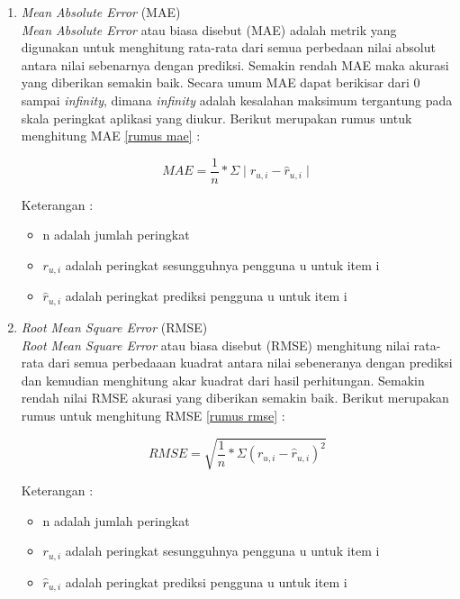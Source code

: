 \begin{enumerate}
    \item \textit{Mean Absolute Error} (MAE) \\
        \textit{Mean Absolute Error} atau biasa disebut (MAE) adalah metrik yang digunakan untuk menghitung rata-rata dari semua perbedaan nilai absolut antara nilai sebenarnya dengan prediksi. Semakin rendah MAE maka akurasi yang diberikan semakin baik. Secara umum MAE dapat berikisar dari 0 sampai \textit{infinity}, dimana \textit{infinity} adalah kesalahan maksimum tergantung pada skala peringkat aplikasi yang diukur. Berikut merupakan rumus untuk menghitung MAE \ref{rumus mae} : 
        
        \begin{equation}
            MAE = \frac{1}{n} * \Sigma \mid r_{u,i}-\hat{r}_{u,i} \mid
            \label{rumus mae}
        \end{equation}
        
        Keterangan : 
        
        \begin{itemize}
            \item n adalah jumlah peringkat
            \item $r_{u,i}$ adalah peringkat sesungguhnya pengguna u untuk item i
            \item $\hat{r}_{u,i}$ adalah peringkat prediksi pengguna u untuk item i
        \end{itemize}
        
    \item \textit{Root Mean Square Error} (RMSE) \\
        \textit{Root Mean Square Error} atau biasa disebut (RMSE) menghitung nilai rata-rata dari semua perbedaaan kuadrat antara nilai sebeneranya dengan prediksi dan kemudian menghitung akar kuadrat dari hasil perhitungan. Semakin rendah nilai RMSE akurasi yang diberikan semakin baik. Berikut merupakan rumus untuk menghitung RMSE \ref{rumus rmse} :
        
        \begin{equation}
            RMSE = \sqrt{\frac{1}{n} * \Sigma (r_{u,i}-\hat{r}_{u,i})^2}
            \label{rumus rmse}
        \end{equation}
        
        Keterangan : 
        
        \begin{itemize}
            \item n adalah jumlah peringkat
            \item $r_{u,i}$ adalah peringkat sesungguhnya pengguna u untuk item i
            \item $\hat{r}_{u,i}$ adalah peringkat prediksi pengguna u untuk item i
        \end{itemize}
\end{enumerate}

